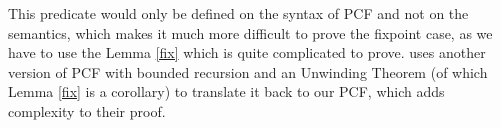 This predicate would only be defined on the syntax of PCF and not on the semantics, which makes it much more difficult to prove the fixpoint case, as we have to use the Lemma \ref{fix} which is quite complicated to prove. \citep{Gunter92} uses another version of PCF with bounded recursion and an Unwinding Theorem (of which Lemma \ref{fix} is a corollary) to translate it back to our PCF, which adds complexity to their proof.  
%
%
%
%
%
%
%


